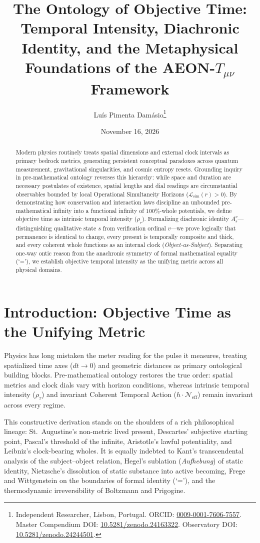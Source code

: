 \documentclass[11pt,a4paper]{article}
\title{The Ontology of Objective Time: Temporal Intensity, Diachronic Identity, and the Metaphysical Foundations of the \textsc{AEON}-$T_{\mu\nu}$ Framework}
\author{Lu\'is Pimenta Dam\'asio\thanks{Independent Researcher, Lisbon, Portugal. ORCID: \href{https://orcid.org}{0009-0001-7606-7557}. Master Compendium DOI: \href{https://doi.org}{10.5281/zenodo.24163322}. Observatory DOI: \href{https://doi.org}{10.5281/zenodo.24244501}.}}
\date{November 16, 2026}
\begin{document}
\maketitle

\begin{abstract}
Modern physics routinely treats spatial dimensions and external clock intervals as primary bedrock metrics, generating persistent conceptual paradoxes across quantum measurement, gravitational singularities, and cosmic entropy resets. Grounding inquiry in pre-mathematical ontology reverses this hierarchy: while space and duration are necessary postulates of existence, spatial lengths and dial readings are circumstantial observables bounded by local Operational Simultaneity Horizons ($\mathcal{L}_{\text{sim}}(r) > 0$). By demonstrating how conservation and interaction laws discipline an unbounded pre-mathematical infinity into a functional infinity of $100\%$-whole potentials, we define objective time as intrinsic temporal intensity ($\rho_\tau$). Formalizing diachronic identity $A_s^v$---distinguishing qualitative state $s$ from verification ordinal $v$---we prove logically that permanence is identical to change, every present is temporally composite and thick, and every coherent whole functions as an internal clock (\emph{Object-as-Subject}). Separating one-way ontic reason from the anachronic symmetry of formal mathematical equality (`='), we establish objective temporal intensity as the unifying metric across all physical domains.
\end{abstract}

\section{Introduction: Objective Time as the Unifying Metric}
Physics has long mistaken the meter reading for the pulse it measures, treating spatialized time axes ($dt \to 0$) and geometric distances as primary ontological building blocks. Pre-mathematical ontology restores the true order: spatial metrics and clock dials vary with horizon conditions, whereas intrinsic temporal intensity ($\rho_\tau$) and invariant Coherent Temporal Action ($h \cdot \mathcal{N}_{\text{eff}}$) remain invariant across every regime.

This constructive derivation stands on the shoulders of a rich philosophical lineage: St.~Augustine's non-metric lived present, Descartes' subjective starting point, Pascal's threshold of the infinite, Aristotle's lawful potentiality, and Leibniz's clock-bearing wholes. It is equally indebted to Kant's transcendental analysis of the subject--object relation, Hegel's sublation (\emph{Aufhebung}) of static identity, Nietzsche's dissolution of static substance into active becoming, Frege and Wittgenstein on the boundaries of formal identity (`='), and the thermodynamic irreversibility of Boltzmann and Prigogine.
\end{document}
